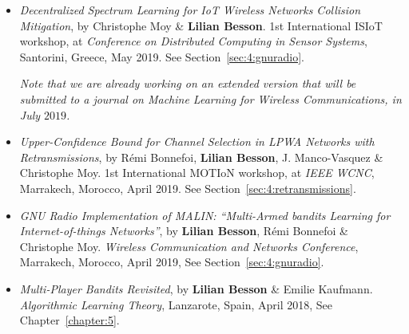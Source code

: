 \begin{itemize}
\item
    \emph{Decentralized Spectrum Learning for IoT Wireless Networks Collision Mitigation},
    by Christophe Moy \& \textbf{Lilian Besson}.
    1st International ISIoT workshop,
    at \emph{Conference on Distributed Computing in Sensor Systems},
    Santorini, Greece, May 2019.
    See Section~\ref{sec:4:gnuradio}.
    \cite{MoyBesson2019}

    \emph{Note that we are already working on an extended version that will be submitted to a journal on Machine Learning for Wireless Communications, in July $2019$.}

\item
    \emph{Upper-Confidence Bound for Channel Selection in LPWA Networks with Retransmissions},
    by Rémi Bonnefoi, \textbf{Lilian Besson}, J. Manco-Vasquez \& Christophe Moy.
    1st International MOTIoN workshop,
    at \emph{IEEE WCNC}, Marrakech, Morocco, April 2019.
    See Section~\ref{sec:4:retransmissions}.
    \cite{Bonnefoi2019WCNC}

\item
    \emph{GNU Radio Implementation of MALIN: ``Multi-Armed bandits Learning for Internet-of-things Networks''},
    by \textbf{Lilian Besson}, Rémi Bonnefoi \& Christophe Moy.
    \emph{Wireless Communication and Networks Conference},
    Marrakech, Morocco, April 2019,
    See Section~\ref{sec:4:gnuradio}.
    \cite{Besson2019WCNC}

\item
    \emph{Multi-Player Bandits Revisited},
    by \textbf{Lilian Besson} \& Emilie Kaufmann.
    \emph{Algorithmic Learning Theory},
    Lanzarote, Spain, April 2018,
    See Chapter~\ref{chapter:5}.
    \cite{Besson2018ALT}


\end{itemize}
